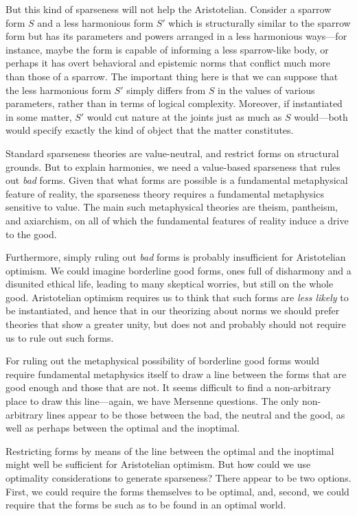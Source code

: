 But this kind of sparseness will not help the Aristotelian. Consider a sparrow form $S$ and a less harmonious form 
$S'$ which is structurally similar to the sparrow form but has its parameters and powers arranged in a less harmonious 
ways---for instance, maybe the form is capable of informing a less sparrow-like body, or perhaps it has overt 
behavioral and epistemic norms that conflict much more than those of a sparrow. The important thing here is that 
we can suppose that the less harmonious form $S'$ simply differs from $S$ in the values of various parameters, rather 
than in terms of logical complexity. Moreover, if instantiated in some matter, $S'$ would cut nature at the joints 
just as much as $S$ would---both would specify exactly the kind of object that the matter constitutes.

Standard sparseness theories are value-neutral, and restrict forms on structural grounds. But to explain harmonies,
we need a value-based sparseness that rules out \textit{bad} forms. Given that what forms are possible is a fundamental
metaphysical feature of reality, the sparseness theory requires a fundamental metaphysics sensitive to value. The main
such metaphysical theories are theism, pantheism, and axiarchism, on all of which the fundamental features of reality 
induce a drive to the good.

Furthermore, simply ruling out \textit{bad} forms is probably insufficient for Aristotelian optimism. We could imagine 
borderline good forms, ones full of disharmony and a disunited ethical life, leading to many skeptical worries, but 
still on the whole good. Aristotelian optimism requires us to think that such forms are \textit{less likely} to be
instantiated, and hence that in our theorizing about norms we should prefer theories that show a greater unity, 
but does not and probably should not require us to rule out such forms. 

For ruling out the metaphysical possibility of borderline good forms would require fundamental metaphysics itself to 
draw a line between the forms that are good enough and those that are not. It seems difficult to find a non-arbitrary
place to draw this line---again, we have Mersenne questions. The only non-arbitrary lines appear to be those between
the bad, the neutral and the good, as well as perhaps between the optimal and the inoptimal.

Restricting forms by means of the line between the optimal and the inoptimal might well be sufficient for Aristotelian 
optimism. But how could we use optimality considerations to generate sparseness? There appear to be two options. First,
we could require the forms themselves to be optimal, and, second, we could require that the forms be such as to be found
in an optimal world. 

